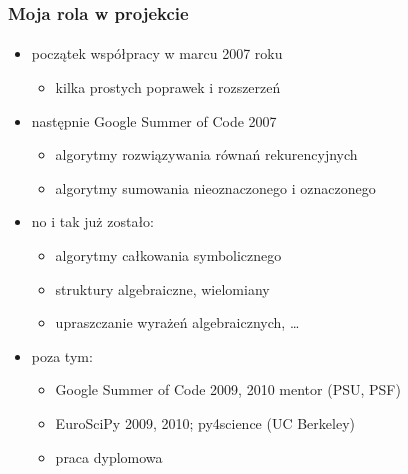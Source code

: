 \documentclass[10pt]{beamer}
\begin{document}
\begin{frame}
    \frametitle{Moja rola w projekcie}
    \framesubtitle{}

    \begin{itemize}
        \item początek współpracy w marcu 2007 roku
            \begin{itemize}
                \item kilka prostych poprawek i rozszerzeń
            \end{itemize}
        \pause
        \item następnie Google Summer of Code 2007
            \begin{itemize}
                \item algorytmy rozwiązywania równań rekurencyjnych
                \item algorytmy sumowania nieoznaczonego i oznaczonego
            \end{itemize}
        \pause
        \item no i tak już zostało:
            \begin{itemize}
                \item algorytmy całkowania symbolicznego
                \item struktury algebraiczne, wielomiany
                \item upraszczanie wyrażeń algebraicznych, \ldots
            \end{itemize}
        \pause
        \item poza tym:
            \begin{itemize}
                \item Google Summer of Code 2009, 2010 mentor (PSU, PSF)
                \item EuroSciPy 2009, 2010; py4science (UC Berkeley)
                \item praca dyplomowa
            \end{itemize}
    \end{itemize}
\end{frame}
\end{document}
